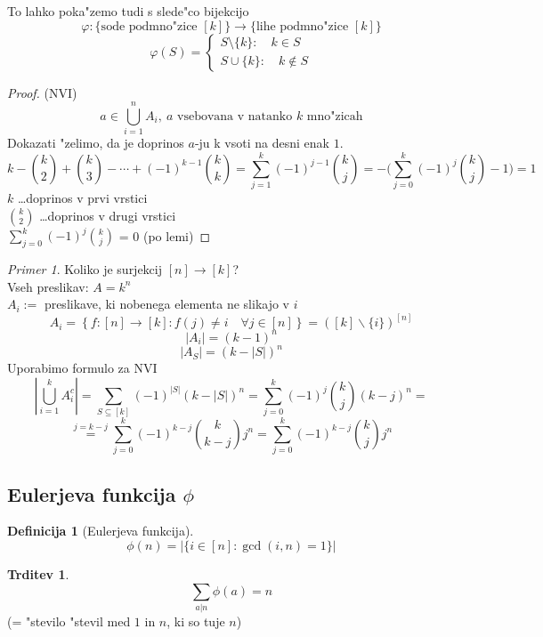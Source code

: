 \documentclass[a4paper,12pt]{article}
\theoremstyle{definition}
\newtheorem{defn}[counter]{Definicija}
\newtheorem{claim}[counter]{Trditev}
\theoremstyle{remark}
\newtheorem*{ex}{Primer}
\begin{document}
To lahko poka"zemo tudi s slede"co bijekcijo
\[\varphi: \{\text{sode podmno"zice }[k]\} \rightarrow \{\text{lihe podmno"zice }[k]\} \]
\[\varphi (S) = \begin{cases}S \setminus \{k\}: \quad k \in S  \\ S \cup \{k\}: \quad k \notin S \end{cases}\]
\pagebreak
\begin{proof}(NVI)
	\label{TODO: tega ne bom gledu}
	\[a \in \bigcup_{i = 1}^{n} A_i,\ a\text{ vsebovana v natanko }k\text{ mno"zicah}\]
	Dokazati "zelimo, da je doprinos $a$-ju k vsoti na desni enak $1$.
	\[k - \binom{k}{2} + \binom{k}{3} - \cdots + (-1)^{k-1} \binom{k}{k} = \sum_{j = 1}^{k} (-1)^{j - 1} \binom{k}{j} = - \bigg(\sum_{j = 0}^{k} (-1)^j \binom{k}{j} - 1\bigg) = 1\]
	$k$ \ldots doprinos v prvi vrstici\\
	$\binom{k}{2}$ \ldots doprinos v drugi vrstici\\
	$\displaystyle \sum_{j = 0}^{k} (-1)^j \binom{k}{j}$ = 0 (po lemi)
\end{proof}

\begin{ex}
    \label{nvi_surjekcije}
	Koliko je surjekcij $[n] \to [k]$? \\ 
	Vseh preslikav: $A=k^n$ \\ 
	$A_i := $ preslikave, ki nobenega elementa ne slikajo v $i$ \\ 
	\[A_i = \left\{f: [n] \to [k]: f(j) \neq i \quad \forall j \in [n] \right\} = \left([k] \backslash \{i\} \right)^{[n]}\]
	\[|A_i| = (k-1)^n\] 
	\[|A_S| = (k-|S|)^n\]
	Uporabimo formulo za NVI \\ 
    \[\left|\bigcup_{i=1}^k A_i^c\right| = \sum_{S \subseteq [k]} (-1)^{|S|}(k-|S|)^n = \sum_{j=0}^k (-1)^j \binom{k}{j}(k-j)^n =\] \[ \stackrel{j=k-j}{=} \sum_{j=0}^k (-1)^{k-j} \binom{k}{k-j}j^n = \sum_{j=0}^k (-1)^{k-j} \binom{k}{j}j^n\]
\end{ex}

\subsection{Eulerjeva funkcija $\phi$} %
\begin{defn}[Eulerjeva funkcija]
	\[\phi (n) = \big|\{i \in [n] : \gcd(i, n) = 1\}\big|\]
\end{defn}

\begin{claim}
	\[\sum_{a | n} \phi (a) = n\]
	(= "stevilo "stevil med $1$ in $n$, ki so tuje $n$)
\end{claim}
\end{document}
